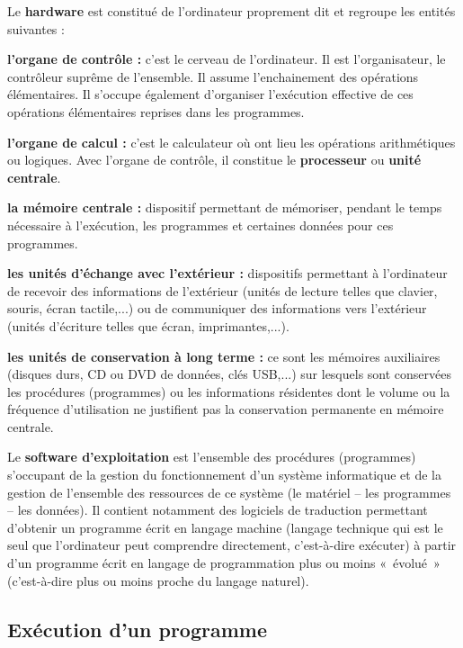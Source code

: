 		Le \textbf{hardware} est constitué de l’ordinateur proprement dit et
		regroupe les entités suivantes :

		\begin{liste}
		\item
			\textbf{l’organe de contrôle :} c’est le cerveau de
			l'ordinateur. Il est l’organisateur, le contrôleur
			suprême de l’ensemble. Il assume l’enchainement des opérations
			élémentaires. Il s’occupe également d’organiser l’exécution effective
			de ces opérations élémentaires reprises dans les programmes.
		\item
			\textbf{l’organe de calcul :} c’est le calculateur où ont lieu les
			opérations arithmétiques ou logiques. Avec l’organe de contrôle, il
			constitue le \textbf{processeur} ou \textbf{unité centrale}.
		\item
			\textbf{la mémoire centrale :} dispositif permettant de mémoriser,
			pendant le temps nécessaire à l’exécution, les programmes et certaines
			données pour ces programmes.
		\item
			\textbf{les unités d’échange avec l’extérieur :} dispositifs permettant
			à l’ordinateur de recevoir des informations de l’extérieur (unités de
			lecture telles que clavier, souris, écran tactile,...) ou de
			communiquer des informations vers l’extérieur (unités d’écriture telles
			que écran, imprimantes,...).
		\item
			\textbf{les unités de conservation à long terme :} ce sont les mémoires
			auxiliaires (disques durs, CD ou DVD de données, clés USB,...) sur
			lesquels sont conservées les procédures (programmes) ou les
			informations résidentes dont le volume ou la fréquence d’utilisation ne
			justifient pas la conservation permanente en mémoire centrale.
		\end{liste}
		
		Le \textbf{software d’exploitation} est l’ensemble des procédures
		(programmes) s’occupant de la gestion du fonctionnement d’un système
		informatique et de la gestion de l’ensemble des ressources de ce
		système (le matériel – les programmes – les données). Il contient
		notamment des logiciels de traduction permettant d’obtenir un programme
		écrit en langage machine (langage technique qui est le seul que
		l’ordinateur peut comprendre directement, c’est-à-dire exécuter) à
		partir d’un programme écrit en langage de programmation plus ou moins
		«~évolué~» (c’est-à-dire plus ou moins proche du langage naturel).

	\subsection{Exécution d'un programme}

